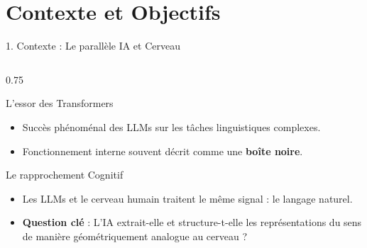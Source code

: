 \documentclass[t, aspectratio=169]{beamer}
\begin{document}
\section{Contexte et Objectifs}

\begin{frame}{1. Contexte : Le parallèle IA et Cerveau}
  \begin{columns}[c]
    \begin{column}{0.75\textwidth}
      \begin{block}{L'essor des Transformers}
        \small
        \begin{itemize}
          \item Succès phénoménal des LLMs sur les tâches linguistiques complexes.
          \item Fonctionnement interne souvent décrit comme une \textcolor{utred}{\textbf{boîte noire}}.
        \end{itemize}
      \end{block}
      
      \begin{block}{Le rapprochement Cognitif}
        \small
        \begin{itemize}
          \item Les LLMs et le cerveau humain traitent le même signal : le langage naturel.
          \item \textbf{Question clé} : L'IA extrait-elle et structure-t-elle les représentations du sens de manière géométriquement analogue au cerveau ?
        \end{itemize}
      \end{block}
    \end{column}

  \end{columns}
\end{frame}
\end{document}
